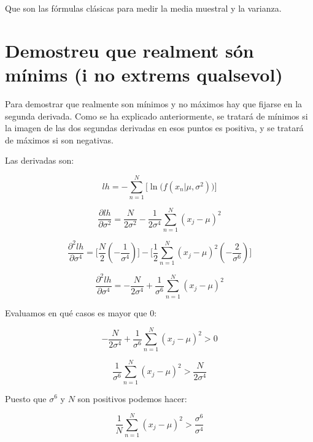 \documentclass[a4paper,10pt]{article}
\begin{document}
Que son las fórmulas clásicas para medir la media muestral y la varianza.

\section{Demostreu que realment són mínims (i no extrems qualsevol)}

Para demostrar que realmente son mínimos y no máximos hay que fijarse en la segunda derivada. Como se ha explicado anteriormente, se tratará de mínimos si la imagen de las dos segundas derivadas en esos puntos es positiva, y se tratará de máximos si son negativas.

Las derivadas son:

\begin{equation*}
lh = - \sum_{n = 1}^{N} \Big[ \ln{\big( f(x_n | \mu, \sigma^2)\big)} \Big]
\end{equation*}

\begin{equation*}
\frac{\partial lh}{\partial \sigma^2} = \frac{N}{2\sigma^2} - \frac{1}{2\sigma^4}\sum_{n = 1}^{N} (x_j - \mu)^2
\end{equation*}

\begin{equation*}
\frac{\partial^2 lh}{\partial \sigma^4} = \Big[ \frac{N}{2}(-\frac{1}{\sigma^4})\Big] - \Big[\frac{1}{2}\sum_{n = 1}^{N} (x_j - \mu)^2(-\frac{2}{\sigma^6}) \Big]
\end{equation*}

\begin{equation*}
\frac{\partial^2 lh}{\partial \sigma^4} =  -\frac{N}{2\sigma^4} + \frac{1}{\sigma^6}\sum_{n = 1}^{N} (x_j - \mu)^2
\end{equation*}

Evaluamos en qué casos es mayor que $0$:

\begin{equation*}
-\frac{N}{2\sigma^4} + \frac{1}{\sigma^6}\sum_{n = 1}^{N} (x_j - \mu)^2 > 0
\end{equation*}

\begin{equation*}
\frac{1}{\sigma^6}\sum_{n = 1}^{N} (x_j - \mu)^2 > \frac{N}{2\sigma^4}
\end{equation*}

Puesto que $\sigma^6$ y $N$ son positivos podemos hacer:

\begin{equation*}
\frac{1}{N}\sum_{n = 1}^{N} (x_j - \mu)^2 > \frac{\sigma^6}{\sigma^4}
\end{equation*}
\end{document}
